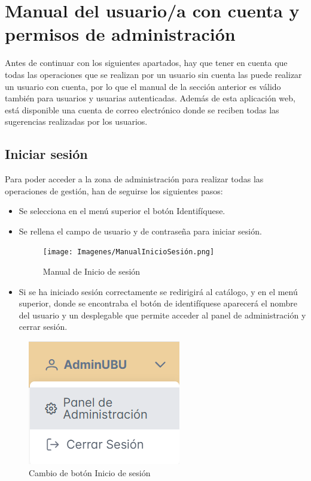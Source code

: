 \section{Manual del usuario/a con cuenta y permisos de administración}
Antes de continuar con los siguientes apartados, hay que tener en cuenta que todas las operaciones que se realizan por un usuario sin cuenta las puede realizar un usuario con cuenta, por lo que el manual de la sección anterior es válido también para usuarios y usuarias autenticadas. Además de esta aplicación web, está disponible una cuenta de correo electrónico donde se reciben todas las sugerencias realizadas por los usuarios.

\subsection{Iniciar sesión}
Para poder acceder a la zona de administración para realizar todas las operaciones de gestión, han de seguirse los siguientes pasos:
\begin{itemize}
    \item Se selecciona en el menú superior el botón Identifíquese.
    \item Se rellena el campo de usuario y de contraseña para iniciar sesión.
    \begin{figure}[h]
        \centering
        \texttt{[image: Imagenes/ManualInicioSesión.png]}
        \caption{Manual de Inicio de sesión}
        \label{Manual de Inicio de sesión}
    \end{figure}
    \FloatBarrier
    \item Si se ha iniciado sesión correctamente se redirigirá al catálogo, y en el menú superior, donde se encontraba el botón de identifíquese aparecerá el nombre del usuario y un desplegable que permite acceder al panel de administración y cerrar sesión.
\end{itemize}
\begin{figure}[h]
        \centering
        \includegraphics[width=0.4\linewidth]{Imagenes/MenuNombreAdmin.png}
        \caption{Cambio de botón Inicio de sesión}
        \label{Cambio de botón Inicio de sesión}
    \end{figure}
    \FloatBarrier

